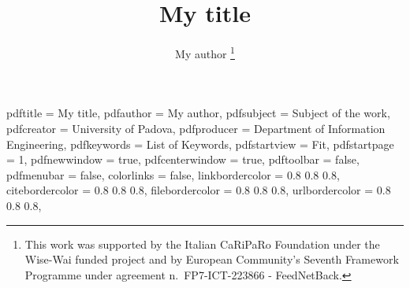 \def\TITLE			{My title}
\def\SHORTTITLE		{M.\ T.}
\def\AUTHOR			{My author}
\def\SHORTAUTHOR	{M.\ A.}
\def\INSTITUTE		{Department of Information Engineering}
\def\SHORTINSTITUTE	{DEI - UniPd}
\def\SUBJECT		{Subject of the work}
\def\KEYWORDS		{List of Keywords}
\def\CREATOR		{University of Padova}
%
\ifpdf \hypersetup
{
	pdftitle		= {\TITLE},
	pdfauthor		= {\AUTHOR},
	pdfsubject		= {\SUBJECT},
	pdfcreator		= {\CREATOR},
	pdfproducer		= {\INSTITUTE},
	pdfkeywords		= {\KEYWORDS},
	pdfstartview	= Fit,			%
	pdfstartpage	= 1,			%
	pdfnewwindow	= true,			%
	pdfcenterwindow	= true,			%
	pdftoolbar		= false,		%
	pdfmenubar		= false,		%
	colorlinks		= false,			%
	linkbordercolor	= 0.8 0.8 0.8,		%
	citebordercolor	= 0.8 0.8 0.8,		%
	filebordercolor	= 0.8 0.8 0.8,		%
	urlbordercolor	= 0.8 0.8 0.8,		%
}
%
%
\fi
%
\title	{\TITLE}
\author
{
	\AUTHOR
	\thanks
	{
		This work was supported by the Italian CaRiPaRo Foundation under the Wise-Wai funded project and by European Community's Seventh Framework Programme under agreement n.\ FP7-ICT-223866 - FeedNetBack.
	}
}
\date	{}								%


%
% 
